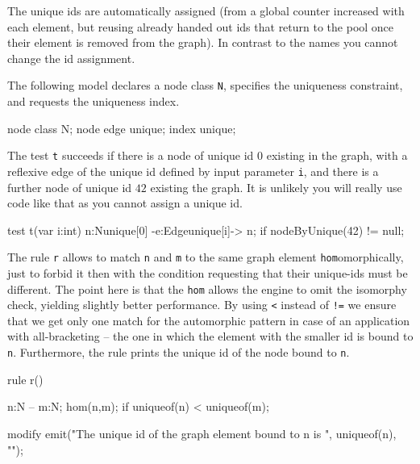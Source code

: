 The unique ids are automatically assigned (from a global counter increased with each element, but reusing already handed out ids that return to the pool once their element is removed from the graph). In contrast to the names you cannot change the id assignment.

\begin{example}

The following model declares a node class \texttt{N}, specifies the uniqueness constraint, and requests the uniqueness index.
 
\begin{grgen}
node class N;
node edge unique;
index unique;
\end{grgen}

The test \texttt{t} succeeds if there is a node of unique id $0$ existing in the graph, with a reflexive edge of the unique id defined by input parameter \texttt{i}, and there is a further node of unique id $42$ existing the graph. It is unlikely you will really use code like that as you cannot assign a unique id.

\begin{grgen}
test t(var i:int) {
  n:N{unique[0]} -e:Edge{unique[i]}-> n;
  if{ nodeByUnique(42) != null; }
}
\end{grgen}

The rule \texttt{r} allows to match \texttt{n} and \texttt{m} to the same graph element \texttt{hom}omorphically, just to forbid it then with the condition requesting that their unique-ids must be different. The point here is that the \texttt{hom} allows the engine to omit the isomorphy check, yielding slightly better performance. By using \verb#<# instead of \verb#!=# we ensure that we get only one match for the automorphic pattern in case of an application with all-bracketing -- the one in which the element with the smaller id is bound to \texttt{n}. Furthermore, the rule prints the unique id of the node bound to \texttt{n}.

\begin{grgen}
rule r() {
  n:N -- m:N;
  hom(n,m);
  if{ uniqueof(n) < uniqueof(m); }
		
  modify {
    emit("The unique id of the graph element bound to n is ", uniqueof(n), "\n");
  }
}
\end{grgen}

\end{example}



